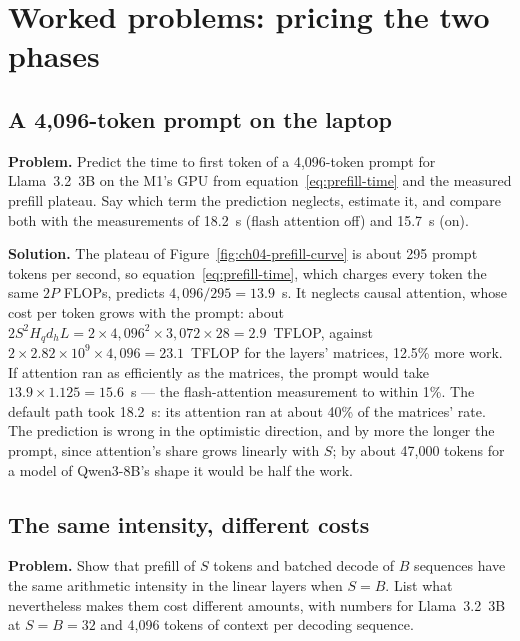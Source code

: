 \section{Worked problems: pricing the two phases}

\subsection{A 4,096-token prompt on the laptop}
\textbf{Problem.} Predict the time to first token of a 4,096-token prompt for
Llama~3.2~3B on the M1's GPU from equation~\eqref{eq:prefill-time} and the
measured prefill plateau. Say which term the prediction neglects, estimate it,
and compare both with the measurements of 18.2~s (flash attention off) and
15.7~s (on).

\textbf{Solution.} The plateau of Figure~\ref{fig:ch04-prefill-curve} is about
295 prompt tokens per second, so equation~\eqref{eq:prefill-time}, which charges
every token the same $2P$ FLOPs, predicts $4{,}096 / 295 = 13.9$~s. It neglects
causal attention, whose cost per token grows with the prompt: about
$2S^{2}H_qd_hL = 2 \times 4{,}096^{2} \times 3{,}072 \times 28 = 2.9$~TFLOP,
against $2 \times 2.82 \times 10^{9} \times 4{,}096 = 23.1$~TFLOP for the layers'
matrices, 12.5\% more work. If attention ran as efficiently as the matrices, the
prompt would take $13.9 \times 1.125 = 15.6$~s --- the flash-attention
measurement to within 1\%. The default path took 18.2~s: its attention ran at
about 40\% of the matrices' rate. The prediction is wrong in the optimistic
direction, and by more the longer the prompt, since attention's share grows
linearly with $S$; by about 47,000 tokens for a model of Qwen3-8B's shape it
would be half the work.

\subsection{The same intensity, different costs}
\textbf{Problem.} Show that prefill of $S$ tokens and batched decode of $B$
sequences have the same arithmetic intensity in the linear layers when $S = B$.
List what nevertheless makes them cost different amounts, with numbers for
Llama~3.2~3B at $S = B = 32$ and 4,096 tokens of context per decoding sequence.

